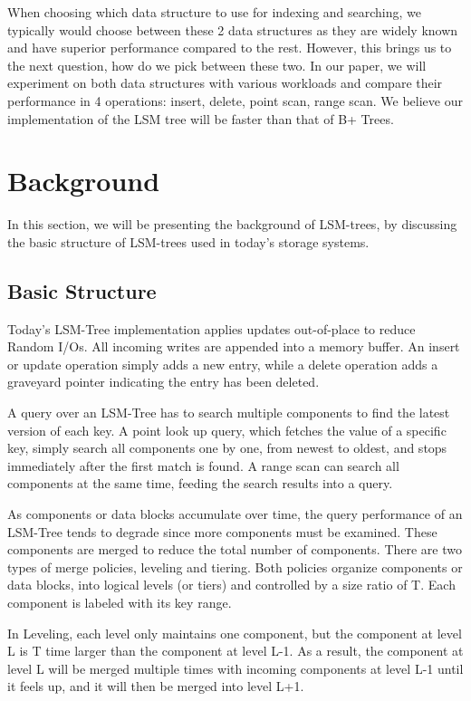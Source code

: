\documentclass[sigconf]{acmart}
\begin{document}
When choosing which data structure to use for indexing and searching, we typically would choose between these 2 data structures as they are widely known and have superior performance compared to the rest. However, this brings us to the next question, how do we pick between these two. In our paper, we will experiment on both data structures with various workloads and compare their performance in 4 operations: insert, delete, point scan, range scan. We believe our implementation of the LSM tree will be faster than that of B+ Trees.


\section{Background}

In this section, we will be presenting the background of LSM-trees, by discussing the basic structure of LSM-trees used in today's storage systems.

\subsection{Basic Structure}
Today's LSM-Tree implementation applies updates out-of-place to reduce Random I/Os. All incoming writes are appended into a memory buffer. An insert or update operation simply adds a new entry, while a delete operation adds a graveyard pointer indicating the entry has been deleted. 

A query over an LSM-Tree has to search multiple components to find the latest version of each key. A point look up query, which fetches the value of a specific key, simply search all components one by one, from newest to oldest, and stops immediately after the first match is found. A range scan can search all components at the same time, feeding the search results into a query.

As components or data blocks accumulate over time, the query performance of an LSM-Tree tends to degrade since more components must be examined. These components are merged to reduce the total number of components. There are two types of merge policies, leveling and tiering. Both policies organize components or data blocks, into logical levels (or tiers) and controlled by a size ratio of T. Each component is labeled with its key range. 

In Leveling, each level only maintains one component, but the component at level L is T time larger than the component at level L-1. As a result, the component at level L will be merged multiple times with incoming components at level L-1 until it feels up, and it will then be merged into level L+1.
\end{document}
